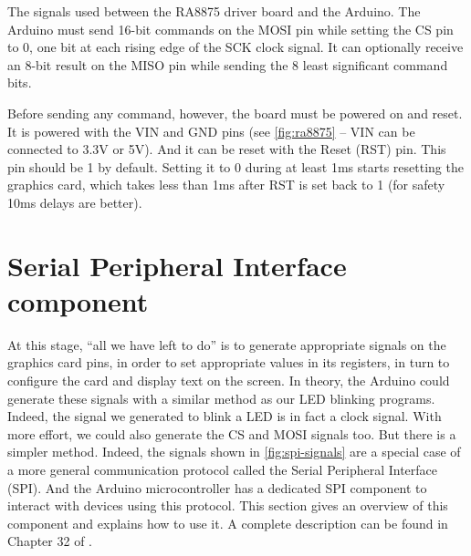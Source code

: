 \begin{Figure}
  

  \caption{The signals used between the RA8875 driver board and the Arduino.
    The Arduino must send 16-bit commands on the MOSI pin while setting the CS
    pin to 0, one bit at each rising edge of the SCK clock signal. It can
    optionally receive an 8-bit result on the MISO pin while sending the 8 least
    significant command bits.}\label{fig:spi-signals}
\end{Figure}

Before sending any command, however, the board must be powered on and reset. It
is powered with the VIN and GND pins (see \cref{fig:ra8875} -- VIN can be
connected to 3.3V or 5V). And it can be reset with the Reset (RST) pin. This
pin should be 1 by default. Setting it to 0 during at least 1ms starts
resetting the graphics card, which takes less than 1ms after RST is set back
to 1 (for safety 10ms delays are better).

\section{Serial Peripheral Interface component}\label{section:spi}

At this stage, ``all we have left to do'' is to generate appropriate signals on
the graphics card pins, in order to set appropriate values in its registers, in
turn to configure the card and display text on the screen. In theory, the
Arduino could generate these signals with a similar method as our LED blinking
programs. Indeed, the signal we generated to blink a LED is in fact a clock
signal. With more effort, we could also generate the CS and MOSI signals too.
But there is a simpler method. Indeed, the signals shown in
\cref{fig:spi-signals} are a special case of a more general communication
protocol called the Serial Peripheral Interface (SPI). And the Arduino
microcontroller has a dedicated SPI component to interact with devices using
this protocol. This section gives an overview of this component and explains
how to use it. A complete description can be found in Chapter 32 of
\cite{SAM3X8E}.

